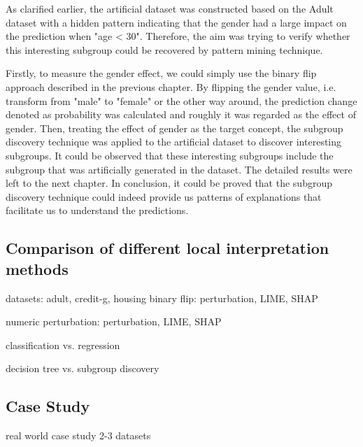 As clarified earlier, the artificial dataset was constructed based on the Adult dataset with a hidden pattern indicating that the gender had a large impact on the prediction when "age < 30". Therefore, the aim was trying to verify whether this interesting subgroup could be recovered by pattern mining technique. 

Firstly, to measure the gender effect, we could simply use the binary flip approach described in the previous chapter. By flipping the gender value, i.e. transform from "male" to "female" or the other way around, the prediction change denoted as probability was calculated and roughly it was regarded as the effect of gender. Then, treating the effect of gender as the target concept, the subgroup discovery technique was applied to the artificial dataset to discover interesting subgroups. It could be observed that these interesting subgroups include the subgroup that was artificially generated in the dataset. The detailed results were left to the next chapter. In conclusion, it could be proved that the subgroup discovery technique could indeed provide us patterns of explanations that facilitate us to understand the predictions. 





\subsection{Comparison of different local interpretation methods}

datasets: adult, credit-g, housing
binary flip: perturbation, LIME, SHAP

numeric perturbation: perturbation, LIME, SHAP

classification vs. regression

decision tree vs. subgroup discovery

\subsection{Case Study}

real world case study 2-3 datasets